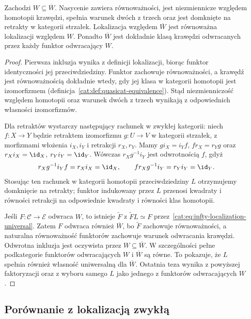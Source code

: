 \begin{stwierdzenie}\label{cat:prop:infty-localization-saturation}
Zachodzi $W\subseteq\overline W$. Nasycenie zawiera równoważności, jest niezmiennicze względem homotopii krawędzi, spełnia warunek dwóch z trzech oraz jest domknięte na retrakty w kategorii strzałek. Lokalizacja względem $\overline W$ jest równoważna lokalizacji względem $W$. Ponadto $\overline W$ jest dokładnie klasą krawędzi odwracanych przez każdy funktor odwracający $W$.
\end{stwierdzenie}
\begin{proof}
Pierwsza inkluzja wynika z definicji lokalizacji, biorąc funktor identyczności jej przeciwdziedziny. Funktor zachowuje równoważności, a krawędź jest równoważnością dokładnie wtedy, gdy jej klasa w kategorii homotopii jest izomorfizmem (definicja~\ref{cat:def:quasicat-equivalence}). Stąd niezmienniczość względem homotopii oraz warunek dwóch z trzech wynikają z odpowiednich własności izomorfizmów.

Dla retraktów wystarczy następujący rachunek w zwykłej kategorii: niech $f:X\to Y$ będzie retraktem izomorfizmu $g:U\to V$ w kategorii strzałek, z morfizmami włożenia $i_X,i_Y$ i retrakcji $r_X,r_Y$. Mamy $g i_X=i_Yf$, $fr_X=r_Yg$ oraz $r_Xi_X=\id_X$, $r_Yi_Y=\id_Y$. Wówczas $r_X g^{-1}i_Y$ jest odwrotnością $f$, gdyż
\[
 r_X g^{-1}i_Y f=r_X i_X=\id_X,\qquad
 f r_Xg^{-1}i_Y=r_Yi_Y=\id_Y.
\]
Stosując ten rachunek w kategorii homotopii przeciwdziedziny $L$ otrzymujemy domknięcie na retrakty; funktor indukowany przez $L$ przenosi kwadraty i równości retrakcji na odpowiednie kwadraty i równości klas homotopii.

Jeśli $F:\mathcal C\to\mathcal E$ odwraca $W$, to istnieje $\widetilde F$ z $\widetilde FL\simeq F$ przez~\eqref{cat:eq:infty-localization-universal}. Zatem $F$ odwraca również $\overline W$, bo $\widetilde F$ zachowuje równoważności, a naturalna równoważność funktorów zachowuje warunek odwracania krawędzi. Odwrotna inkluzja jest oczywista przez $W\subseteq\overline W$. W szczególności pełne podkategorie funktorów odwracających $W$ i $\overline W$ są równe. To pokazuje, że $L$ spełnia również własność uniwersalną dla $\overline W$. Ostatnia teza wynika z powyższej faktoryzacji oraz z wyboru samego $L$ jako jednego z funktorów odwracających $W$.
\end{proof}

\subsection{Porównanie z lokalizacją zwykłą}

